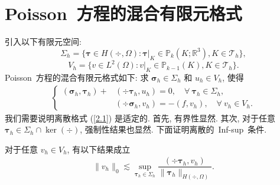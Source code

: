 	\section{Poisson~方程的混合有限元格式}
	引入以下有限元空间:
	$$\Sigma_h=\{\boldsymbol\tau\in H(\div,\Omega): \boldsymbol\tau|_K\in\mathbb{P}_k(K;\mathbb{R}^3), K\in\mathcal{T}_h\},$$
	$$V_h=\{v\in L^2(\Omega): v|_K\in\mathbb{P}_{k-1}(K), K\in\mathcal{T}_h\}.$$
	Poisson~方程的混合有限元格式如下:
	求 $\boldsymbol\sigma_h\in\Sigma_h$ 和 $u_h\in V_h$, 使得
	\begin{align}
		\label{2.1}
		\left\{
		\begin{array}{ll}
			(\boldsymbol\sigma_h, \boldsymbol\tau_h)+&(\div\boldsymbol\tau_h, u_h) = 0, \quad \forall \ \boldsymbol\tau_h\in\Sigma_h, \\
			&(\div\boldsymbol\sigma_h, v_h) = -(f, v_h), \quad \forall \ v_h\in V_h.
		\end{array}
		\right.
	\end{align}
	我们需要说明离散格式 (\ref{2.1}) 是适定的. 首先, 有界性显然. 其次, 对于任意 $\boldsymbol\tau_h\in\Sigma_h\cap\ker(\div)$, 强制性结果也显然. 下面证明离散的~Inf-sup~条件.
	\begin{lemma}
		对于任意 $v_h\in V_h$, 有以下结果成立
		\begin{align}
			\label{2.2}
			\|v_h\|_0\lesssim\sup_{\boldsymbol\tau_h\in \Sigma_h}\dfrac{(\div\boldsymbol\tau_h, v_h)}{\|\boldsymbol\tau_h\|_{H(\div, \Omega)}}.
		\end{align}
	\end{lemma}
